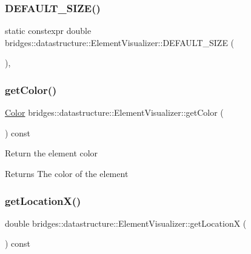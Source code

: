 \subsubsection{\texorpdfstring{DEFAULT\_SIZE()}{DEFAULT\_SIZE()}}
{\footnotesize\ttfamily static constexpr double bridges\+::datastructure\+::\+Element\+Visualizer\+::\+D\+E\+F\+A\+U\+L\+T\+\_\+\+S\+I\+ZE (\begin{DoxyParamCaption}{ }\end{DoxyParamCaption})\hspace{0.3cm}{\ttfamily [inline]}, {\ttfamily [static]}}

\mbox{\label{classbridges_1_1datastructure_1_1_element_visualizer_a611005282caa27575cf3ee7e3b1540c4}} 
\subsubsection{\texorpdfstring{getColor()}{getColor()}}
{\footnotesize\ttfamily \mbox{\hyperlink{classbridges_1_1datastructure_1_1_color}{Color}} bridges\+::datastructure\+::\+Element\+Visualizer\+::get\+Color (\begin{DoxyParamCaption}{ }\end{DoxyParamCaption}) const\hspace{0.3cm}{\ttfamily [inline]}}

Return the element color \begin{DoxyReturn}{Returns}
The color of the element 
\end{DoxyReturn}
\mbox{\label{classbridges_1_1datastructure_1_1_element_visualizer_a8ee6ac3a3b03194d51cfbc08a1360b5d}} 
\subsubsection{\texorpdfstring{getLocationX()}{getLocationX()}}
{\footnotesize\ttfamily double bridges\+::datastructure\+::\+Element\+Visualizer\+::get\+LocationX (\begin{DoxyParamCaption}{ }\end{DoxyParamCaption}) const\hspace{0.3cm}{\ttfamily [inline]}}

